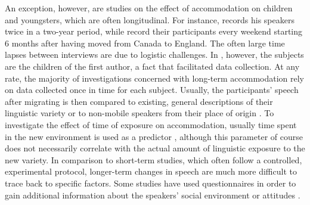 \documentclass[output=paper,
modfonts
]{langscibook}
\begin{document}
An exception, however, are studies on the effect of accommodation on children and youngsters, which are often longitudinal. For instance, \citet{chambers_dialect_1992} records his speakers twice in a two-year period, while \citet{tagliamonte_howd_2007} record their participants every weekend starting 6 months after having moved from Canada to England. The often large time lapses between interviews are due to logistic challenges. In \citet{tagliamonte_howd_2007}, however, the subjects are the children of the first author, a fact that facilitated data collection.
% 
% 
% 
% 
At any rate, the majority of investigations concerned with long-term accommodation rely on data collected once in time for each subject. Usually, the participants' speech after migrating is then compared to existing, general descriptions of their linguistic variety \citep{shockey_all_1984, trudgill_dialects_1986, MolinaMartos2010} or to non-mobile speakers from their place of origin \citep{PalaciosAlcaine2007,Fernandez2013}. To investigate the effect of time of exposure on accommodation, usually time spent in the new environment is used as a predictor \citep{shockey_all_1984, romera_prosodic_2013, erker_contact_2016}, although this parameter of course does not necessarily correlate with the actual amount of linguistic exposure to the new variety. In comparison to short-term studies, which often follow a controlled, experimental protocol, longer-term changes in speech are much more difficult to trace back to specific factors. Some studies have used questionnaires in order to gain additional information about the speakers' social environment or attitudes \citep[e.g.][]{pesqueira_cambio_2008}.
% 
% 
\end{document}
